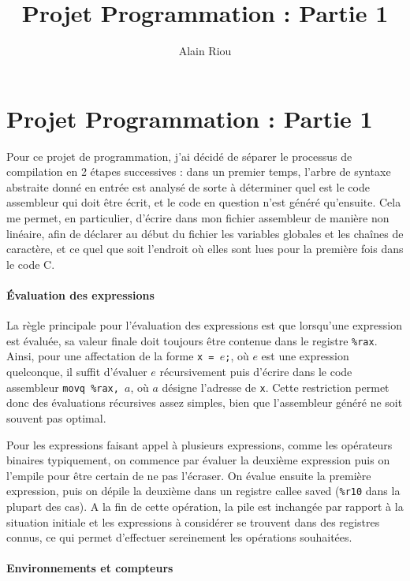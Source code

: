 \documentclass[10pt,a4paper]{article}
\title{Projet Programmation : Partie 1}
\author{Alain Riou}
\begin{document}
\section*{Projet Programmation : Partie 1}

Pour ce projet de programmation, j'ai décidé de séparer le processus de compilation en 2 étapes successives : dans un premier temps, l'arbre de syntaxe abstraite donné en entrée est analysé de sorte à déterminer quel est le code assembleur qui doit être écrit, et le code en question n'est généré qu'ensuite. Cela me permet, en particulier, d'écrire dans mon fichier assembleur de manière non linéaire, afin de déclarer au début du fichier les variables globales et les chaînes de caractère, et ce quel que soit l'endroit où elles sont lues pour la première fois dans le code C.

\paragraph{Évaluation des expressions}

La règle principale pour l'évaluation des expressions est que lorsqu'une expression est évaluée, sa valeur finale doit toujours être contenue dans le registre \texttt{\%rax}. Ainsi, pour une affectation de la forme \texttt{x = $e$;}, où $e$ est une expression quelconque, il suffit d'évaluer $e$ récursivement puis d'écrire dans le code assembleur \texttt{movq \%rax, $a$}, où $a$ désigne l'adresse de \texttt{x}. Cette restriction permet donc des évaluations récursives assez simples, bien que l'assembleur généré ne soit souvent pas optimal.

Pour les expressions faisant appel à plusieurs expressions, comme les opérateurs binaires typiquement, on commence par évaluer la deuxième expression puis on l'empile pour être certain de ne pas l'écraser. On évalue ensuite la première expression, puis on dépile la deuxième dans un registre callee saved (\texttt{\%r10} dans la plupart des cas). A la fin de cette opération, la pile est inchangée par rapport à la situation initiale et les expressions à considérer se trouvent dans des registres connus, ce qui permet d'effectuer sereinement les opérations souhaitées.

\paragraph{Environnements et compteurs}
\end{document}
